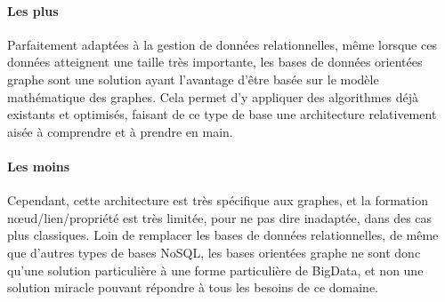 \documentclass[a4paper,11pt]{article}
\begin{document}
		\paragraph{Les plus}
		Parfaitement adaptées à la gestion de données relationnelles, même lorsque ces données atteignent une taille très importante, les bases de données orientées graphe sont une solution ayant l’avantage d’être basée sur le modèle mathématique des graphes. Cela permet d’y appliquer des algorithmes déjà existants et optimisés, faisant de ce type de base une architecture relativement aisée à comprendre et à prendre en main.

		\paragraph{Les moins}
		Cependant, cette architecture est très spécifique aux graphes, et la formation n\oe{}ud/lien/propriété est très limitée, pour ne pas dire inadaptée, dans des cas plus classiques. Loin de remplacer les bases de données relationnelles, de même que d’autres types de bases NoSQL, les bases orientées graphe ne sont donc qu’une solution particulière à une forme particulière de BigData, et non une solution \og{}miracle\fg{} pouvant répondre à tous les besoins de ce domaine.
\end{document}
